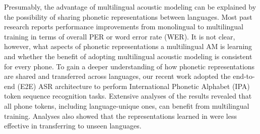 \documentclass{article}
\begin{document}
Presumably, the advantage of multilingual acoustic modeling 
can be explained by the possibility of sharing phonetic representations between languages.
Most past research reports performance improvements from monolingual to multilingual training in terms of overall PER or word error rate (WER).
It is not clear, however, what aspects of phonetic representations a multilingual AM is learning and 
whether the benefit of adopting multilingual acoustic modeling is consistent
for every phone.
To gain a deeper understanding of how phonetic representations are shared and transferred across languages, our recent work \cite{Zelasko2020That} adopted the end-to-end (E2E) ASR architecture \cite{kim2017joint} to perform International Phonetic Alphabet (IPA)  token sequence recognition tasks.
Extensive analyses of the results revealed that all phone tokens, including language-unique ones, can benefit from multilingual training. 
Analyses also showed that the representations learned in \cite{Zelasko2020That} were less effective in transferring to unseen languages.
\end{document}
